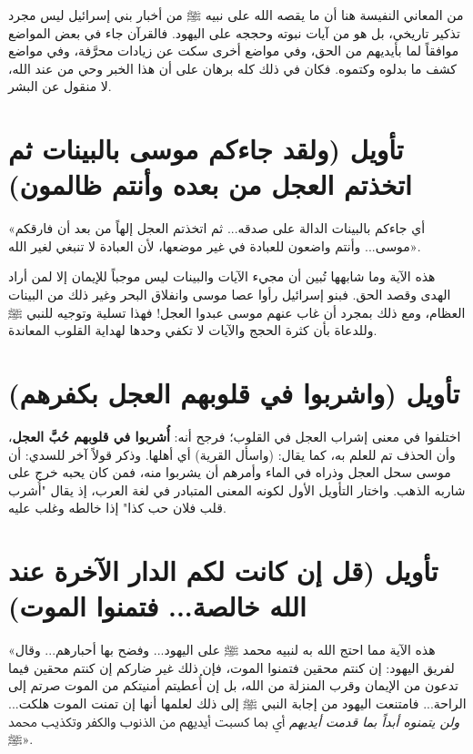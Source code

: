 \begin{fawaid}
من المعاني النفيسة هنا أن ما يقصه الله على نبيه ﷺ من أخبار بني إسرائيل ليس مجرد تذكير تاريخي، بل هو من آيات نبوته وحججه على اليهود. فالقرآن جاء في بعض المواضع موافقاً لما بأيديهم من الحق، وفي مواضع أخرى سكت عن زيادات محرَّفة، وفي مواضع كشف ما بدلوه وكتموه. فكان في ذلك كله برهان على أن هذا الخبر وحي من عند الله، لا منقول عن البشر.
\end{fawaid}

\separator

\section{تأويل (ولقد جاءكم موسى بالبينات ثم اتخذتم العجل من بعده وأنتم ظالمون)}
 «أي جاءكم بالبينات الدالة على صدقه... ثم اتخذتم العجل إلهاً من بعد أن فارقكم موسى... وأنتم واضعون للعبادة في غير موضعها، لأن العبادة لا تنبغي لغير الله».

\begin{fawaid}
هذه الآية وما شابهها تُبين أن مجيء الآيات والبينات ليس موجباً للإيمان إلا لمن أراد الهدى وقصد الحق. فبنو إسرائيل رأوا عصا موسى وانفلاق البحر وغير ذلك من البينات العظام، ومع ذلك بمجرد أن غاب عنهم موسى عبدوا العجل! فهذا تسلية وتوجيه للنبي ﷺ وللدعاة بأن كثرة الحجج والآيات لا تكفي وحدها لهداية القلوب المعاندة.
\end{fawaid}

\separator

\section{تأويل (واشربوا في قلوبهم العجل بكفرهم)}
اختلفوا في معنى إشراب العجل في القلوب؛ فرجح  أنه: \textbf{أُشربوا في قلوبهم حُبَّ العجل}، وأن الحذف تم للعلم به، كما يقال: (واسأل القرية) أي أهلها. وذكر قولاً آخر للسدي: أن موسى سحل العجل وذراه في الماء وأمرهم أن يشربوا منه، فمن كان يحبه خرج على شاربه الذهب.
واختار  التأويل الأول لكونه المعنى المتبادر في لغة العرب، إذ يقال "أُشرب قلب فلان حب كذا" إذا خالطه وغلب عليه.

\separator

\section{تأويل (قل إن كانت لكم الدار الآخرة عند الله خالصة... فتمنوا الموت)}
 «هذه الآية مما احتج الله به لنبيه محمد ﷺ على اليهود... وفضح بها أحبارهم... وقال لفريق اليهود: إن كنتم محقين فتمنوا الموت، فإن ذلك غير ضاركم إن كنتم محقين فيما تدعون من الإيمان وقرب المنزلة من الله، بل إن أُعطيتم أمنيتكم من الموت صرتم إلى الراحة... فامتنعت اليهود من إجابة النبي ﷺ إلى ذلك لعلمها أنها إن تمنت الموت هلكت... \textit{ولن يتمنوه أبداً بما قدمت أيديهم} أي بما كسبت أيديهم من الذنوب والكفر وتكذيب محمد ﷺ».

